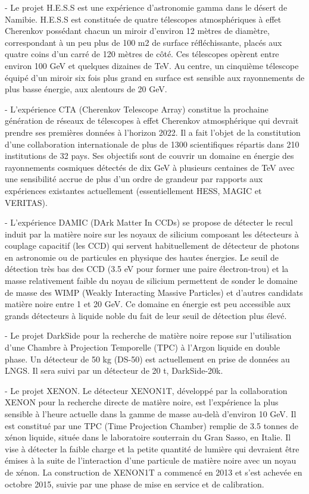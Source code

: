 \documentclass[french,a4paper,12pt]{report}
\begin{document}
\begin{itemize}
			- Le projet H.E.S.S est une expérience d'astronomie gamma dans le désert de Namibie. H.E.S.S est constituée de quatre télescopes atmosphériques à effet Cherenkov possédant chacun un miroir d’environ 12 mètres de diamètre, correspondant à un peu plus de 100 m2 de surface réfléchissante, placés aux quatre coins d’un carré de 120 mètres de côté. Ces télescopes opèrent entre environ 100 GeV et quelques dizaines de TeV. Au centre, un cinquième télescope équipé d’un miroir six fois plus grand en surface est sensible aux rayonnements de plus basse énergie, aux alentours de 20 GeV. 
			
			- L'expérience CTA (Cherenkov Telescope Array) constitue la prochaine génération de réseaux de télescopes à effet Cherenkov atmosphérique qui devrait prendre ses premières données à l’horizon 2022. Il a fait l’objet de la constitution d’une collaboration internationale de plus de 1300 scientifiques répartis dans 210 institutions de 32 pays. Ses objectifs sont de couvrir un domaine en énergie des rayonnements cosmiques détectés de dix GeV à plusieurs centaines de TeV avec une sensibilité accrue de plus d’un ordre de grandeur par rapports aux expériences existantes actuellement (essentiellement HESS, MAGIC et VERITAS).
			
			- L’expérience DAMIC (DArk Matter In CCDs) se propose de détecter le recul induit par la matière noire sur les noyaux de silicium composant les détecteurs à couplage capacitif (les CCD) qui servent habituellement de détecteur de photons en astronomie ou de particules en physique des hautes énergies. Le seuil de détection très bas des CCD (3.5 eV pour former une paire électron-trou) et la masse relativement faible du noyau de silicium permettent de sonder le domaine de masse des WIMP (Weakly Interacting Massive Particles) et d’autres candidats matière noire entre 1 et 20 GeV. Ce domaine en énergie est peu accessible aux grands détecteurs à liquide noble du fait de leur seuil de détection plus élevé.
						
			- Le projet DarkSide pour la recherche de matière noire repose sur l’utilisation d’une Chambre à Projection Temporelle (TPC) à l’Argon liquide en double phase. Un détecteur de 50 kg (DS-50) est actuellement en prise de données au LNGS. Il sera suivi par un détecteur de 20 t, DarkSide-20k.
			
			- Le projet XENON.
			Le détecteur XENON1T, développé par la collaboration XENON pour la recherche directe de matière noire, est l’expérience la plus sensible à l’heure actuelle dans la gamme de masse au-delà d’environ 10 GeV. Il est constitué par une TPC (Time Projection Chamber) remplie de 3.5 tonnes de xénon liquide, située dans le laboratoire souterrain du Gran Sasso, en Italie. Il vise à détecter la faible charge et la petite quantité de lumière qui devraient être émises à la suite de l’interaction d’une particule de matière noire avec un noyau de xénon. La construction de XENON1T a commencé en 2013 et s’est achevée en octobre 2015, suivie par une phase de mise en service et de calibration.
			

\end{itemize}
\end{document}
